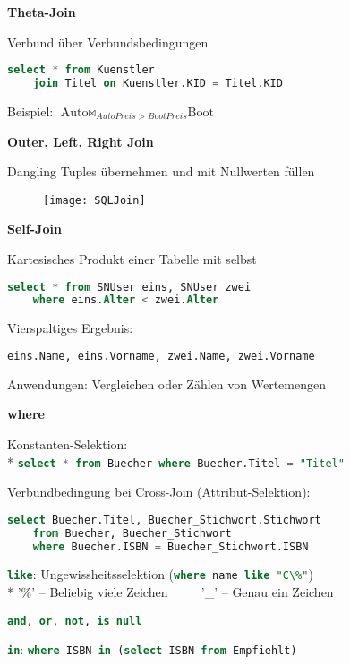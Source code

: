 \textbf{Theta-Join}
\begin{items}
	\item Verbund über Verbundsbedingungen
	\begin{lstlisting}[language=sql]
select * from Kuenstler 
	join Titel on Kuenstler.KID = Titel.KID
	\end{lstlisting}
	\item Beispiel: \(  \text{Auto} \bowtie_{AutoPreis > BootPreis} \text{Boot} \)
\end{items}

\textbf{Outer, Left, Right Join}
\begin{items}
	\item Dangling Tuples übernehmen und mit Nullwerten füllen
	\begin{figure}[H]\centering\label{SQLJoin}\texttt{[image: SQLJoin]}\end{figure}
\end{items}

\textbf{Self-Join}
\begin{items}
	\item Kartesisches Produkt einer Tabelle mit selbst
	\begin{lstlisting}[language=sql] 
	select * from SNUser eins, SNUser zwei
	where eins.Alter < zwei.Alter
	\end{lstlisting}
	Vierspaltiges Ergebnis:
	\begin{lstlisting}[language=sql]
eins.Name, eins.Vorname, zwei.Name, zwei.Vorname
	\end{lstlisting}
	\item Anwendungen: Vergleichen oder Zählen von Wertemengen
\end{items}

\newpage

\textbf{where}
\begin{items}
	\item Konstanten-Selektion: \\*
	\lstinline[language=sql]{select * from Buecher where Buecher.Titel = "Titel"}
	\item Verbundbedingung bei Cross-Join (Attribut-Selektion):
	\begin{lstlisting}[language=sql]
select Buecher.Titel, Buecher_Stichwort.Stichwort
	from Buecher, Buecher_Stichwort
	where Buecher.ISBN = Buecher_Stichwort.ISBN
	\end{lstlisting}
	\item \lstinline[language=sql]{like}: Ungewissheitsselektion
	(\lstinline[language=sql]{where name like "C\%"})\\*
	'\%' -- Beliebig viele Zeichen $\qquad$ '\_' -- Genau ein Zeichen
	\item \lstinline[language=sql]{and, or, not, is null}
	\item \lstinline[language=sql]{in}: \lstinline[language=sql]{where ISBN in (select ISBN from Empfiehlt)}
\end{items}

